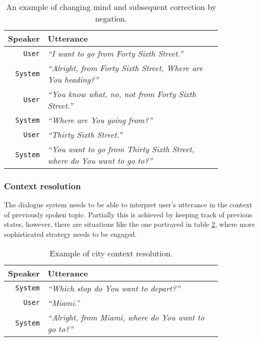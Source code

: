 \begin{table}[h]
\centering
\begin{tabular}{ | r | p{0.85\linewidth} | } \hline
	Speaker & Utterance \\ \hline
	\texttt{User} & \textit{``I want to go from Forty Sixth Street.''} \\ \hline
	\texttt{System} & \textit{``Alright, from Forty Sixth Street, Where are You heading?''} \\ \hline	
	\texttt{User} & \textit{``You know what, no, not from Forty Sixth Street.''} \\ \hline
	\texttt{System} & \textit{``Where are You going from?''} \\ \hline
	\texttt{User} & \textit{``Thirty Sixth Street.''} \\ \hline
	\texttt{System} & \textit{``You want to go from Thirty Sixth Street, where do You want to go to?''} \\ \hline
\end{tabular}
\caption[Changing input by negation]{An example of changing mind and subsequent correction by negation.}
\label{table:negation}
\end{table}

\subsubsection{Context resolution}

The dialogue system needs to be able to interpret user's utterance in the context of previously spoken topic.
Partially this is achieved by keeping track of previous states, however, there are situations like the one portrayed in table \ref{table:cr}, where more sophisticated strategy needs to be engaged.

\begin{table}[h]
\centering
\begin{tabular}{ | r | p{0.85\linewidth} | } \hline
	Speaker & Utterance \\ \hline
	\texttt{System} & \textit{``Which stop do You want to depart?''} \\ \hline
	\texttt{User} & \textit{``Miami.}'' \\ \hline
	\texttt{System} & \textit{``Alright, from Miami, where do You want to go to?''} \\ \hline
\end{tabular}
\caption[Context resolution]{Example of city context resolution.}
\label{table:cr}
\end{table}

